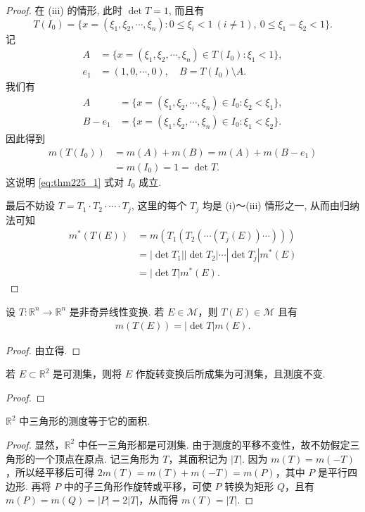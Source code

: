\documentclass[../../main.tex]{subfiles}
\begin{document}
\begin{proof}
在 (iii) 的情形, 此时 $\det T = 1$, 而且有
\[
T(I_0) = \{x = (\xi_1,\xi_2,\cdots,\xi_n): 0\leqslant\xi_i < 1\ (i\neq 1),\ 0\leqslant\xi_1 - \xi_2 < 1\}.
\]
记
\begin{align*}
A &= \{x = (\xi_1,\xi_2,\cdots,\xi_n)\in T(I_0): \xi_1 < 1\},\\
e_1 &= (1,0,\cdots,0),\quad B = T(I_0)\setminus A.
\end{align*}
我们有
\begin{align*}
A &= \{x = (\xi_1,\xi_2,\cdots,\xi_n)\in I_0: \xi_2 < \xi_1\},\\
B - e_1 &= \{x = (\xi_1,\xi_2,\cdots,\xi_n)\in I_0: \xi_1 < \xi_2\}.
\end{align*}
因此得到
\begin{align*}
m(T(I_0)) &= m(A) + m(B) = m(A) + m(B - e_1)\\
&= m(I_0) = 1 = \det T.
\end{align*}
这说明 \eqref{eq:thm225_1} 式对 $I_0$ 成立.

最后不妨设 $T = T_1\cdot T_2\cdot\cdots\cdot T_j$, 这里的每个 $T_j$ 均是 (i)～(iii) 情形之一, 从而由归纳法可知
\begin{align*}
m^*(T(E)) &= m(T_1(T_2(\cdots(T_j(E))\cdots)))\\
&= |\det T_1||\det T_2|\cdots|\det T_j|m^*(E)\\
&= |\det T|m^*(E).
\end{align*}
\end{proof}

\begin{corollary}
设 \(T:\mathbb{R}^n \to \mathbb{R}^n\) 是非奇异线性变换. 若 \(E \in \mathscr{M}\)，则 \(T(E)\in\mathscr{M}\) 且有
\begin{align*}
m(T(E)) = |\det T|m(E).
\end{align*}
\end{corollary}
\begin{proof}
由立得.
\end{proof}

\begin{example}
若 \(E \subset \mathbb{R}^2\) 是可测集，则将 \(E\) 作旋转变换后所成集为可测集，且测度不变.
\end{example}
\begin{proof}

\end{proof}

\begin{example}
\(\mathbb{R}^2\) 中三角形的测度等于它的面积.
\end{example}
\begin{proof}
显然，\(\mathbb{R}^2\) 中任一三角形都是可测集. 由于测度的平移不变性，故不妨假定三角形的一个顶点在原点. 记三角形为 \(T\)，其面积记为 \(|T|\). 因为 \(m(T)=m(-T)\)，所以经平移后可得 \(2m(T)=m(T)+m(-T)=m(P)\)，其中 \(P\) 是平行四边形. 再将 \(P\) 中的子三角形作旋转或平移，可使 \(P\) 转换为矩形 \(Q\)，且有 \(m(P)=m(Q)=|P| = 2|T|\)，从而得 \(m(T)=|T|\).
\end{proof}
\end{document}
